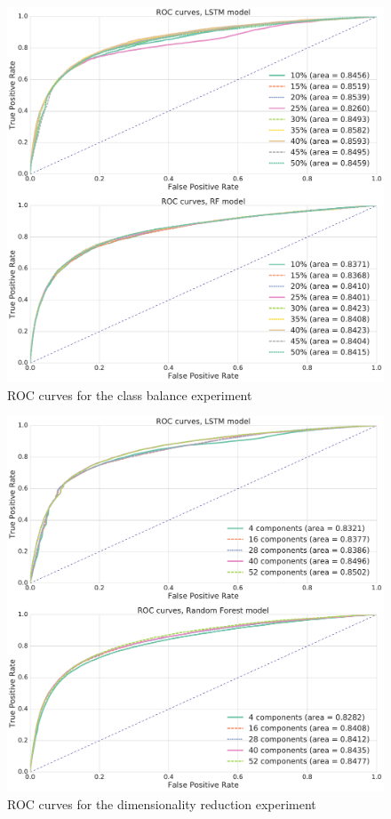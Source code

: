 \documentclass{kththesis}
\begin{document}
\begin{figure}
    \centering
    \includegraphics[width=1.0\textwidth,keepaspectratio]{figures/roc_class_balance.pdf}
    \caption{ROC curves for the class balance experiment}
    \label{fig:roc_class_balance}
\end{figure}

\begin{figure}
    \centering
    \includegraphics[width=1.0\textwidth,keepaspectratio]{figures/roc_dim_reduction.pdf}
    \caption{ROC curves for the dimensionality reduction experiment}
    \label{fig:roc_dim_reduction}
\end{figure}
\end{document}
